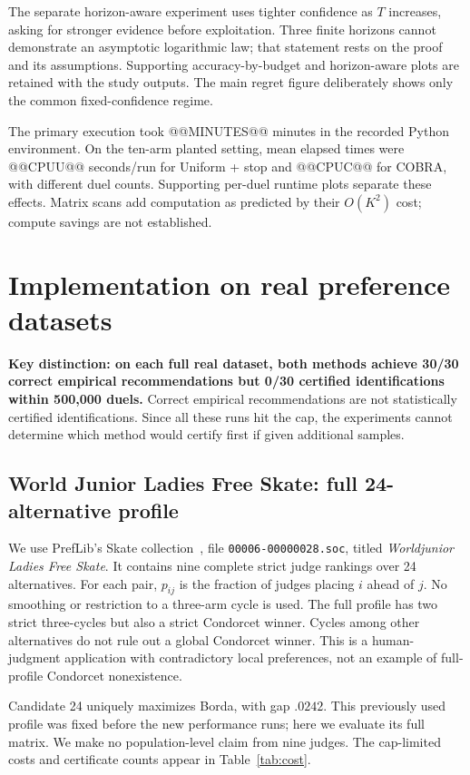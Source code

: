 \documentclass[11pt,a4paper]{article}
\begin{document}
The separate horizon-aware experiment uses tighter confidence as $T$ increases, asking for stronger evidence before exploitation. Three finite horizons cannot demonstrate an asymptotic logarithmic law; that statement rests on the proof and its assumptions. Supporting accuracy-by-budget and horizon-aware plots are retained with the study outputs. The main regret figure deliberately shows only the common fixed-confidence regime.

The primary execution took @@MINUTES@@ minutes in the recorded Python environment. On the ten-arm planted setting, mean elapsed times were @@CPUU@@ seconds/run for Uniform + stop and @@CPUC@@ for COBRA, with different duel counts. Supporting per-duel runtime plots separate these effects. Matrix scans add computation as predicted by their $O(K^2)$ cost; compute savings are not established.

\section{Implementation on real preference datasets}
\textbf{Key distinction: on each full real dataset, both methods achieve 30/30 correct empirical recommendations but 0/30 certified identifications within 500,000 duels.} Correct empirical recommendations are not statistically certified identifications. Since all these runs hit the cap, the experiments cannot determine which method would certify first if given additional samples.
\subsection{World Junior Ladies Free Skate: full 24-alternative profile}
We use PrefLib's Skate collection~\cite{preflib,skate}, file \texttt{00006-00000028.soc}, titled \emph{Worldjunior Ladies Free Skate}. It contains nine complete strict judge rankings over 24 alternatives. For each pair, $p_{ij}$ is the fraction of judges placing $i$ ahead of $j$. No smoothing or restriction to a three-arm cycle is used. The full profile has two strict three-cycles but also a strict Condorcet winner. Cycles among other alternatives do not rule out a global Condorcet winner. This is a human-judgment application with contradictory local preferences, not an example of full-profile Condorcet nonexistence.

Candidate 24 uniquely maximizes Borda, with gap $.0242$. This previously used profile was fixed before the new performance runs; here we evaluate its full matrix. We make no population-level claim from nine judges. The cap-limited costs and certificate counts appear in Table~\ref{tab:cost}.
\end{document}

